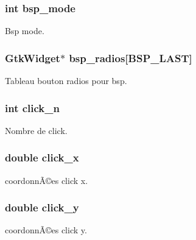 \subsubsection[{\texorpdfstring{bsp\+\_\+mode}{bsp_mode}}]{\setlength{\rightskip}{0pt plus 5cm}int bsp\+\_\+mode}\hypertarget{struct_mydata_a2a4a5364f7ffa17761866a77f6a54556}{}\label{struct_mydata_a2a4a5364f7ffa17761866a77f6a54556}
Bsp mode. 
\subsubsection[{\texorpdfstring{bsp\+\_\+radios}{bsp_radios}}]{\setlength{\rightskip}{0pt plus 5cm}Gtk\+Widget$\ast$ bsp\+\_\+radios\mbox{[}B\+S\+P\+\_\+\+L\+A\+ST\mbox{]}}\hypertarget{struct_mydata_af0129a7558616569b70f65f56fd2aed0}{}\label{struct_mydata_af0129a7558616569b70f65f56fd2aed0}
Tableau bouton radios pour bsp. 
\subsubsection[{\texorpdfstring{click\+\_\+n}{click_n}}]{\setlength{\rightskip}{0pt plus 5cm}int click\+\_\+n}\hypertarget{struct_mydata_a4cbcc68b0a3ae7651f3363348f4d7456}{}\label{struct_mydata_a4cbcc68b0a3ae7651f3363348f4d7456}
Nombre de click. 
\subsubsection[{\texorpdfstring{click\+\_\+x}{click_x}}]{\setlength{\rightskip}{0pt plus 5cm}double click\+\_\+x}\hypertarget{struct_mydata_a49a0f74fc7cb65d2a8ba39006d9e5056}{}\label{struct_mydata_a49a0f74fc7cb65d2a8ba39006d9e5056}
coordonnÃ©es click x. 
\subsubsection[{\texorpdfstring{click\+\_\+y}{click_y}}]{\setlength{\rightskip}{0pt plus 5cm}double click\+\_\+y}\hypertarget{struct_mydata_ad50bebb00d8beaa505e312f9597a41a5}{}\label{struct_mydata_ad50bebb00d8beaa505e312f9597a41a5}
coordonnÃ©es click y. 
